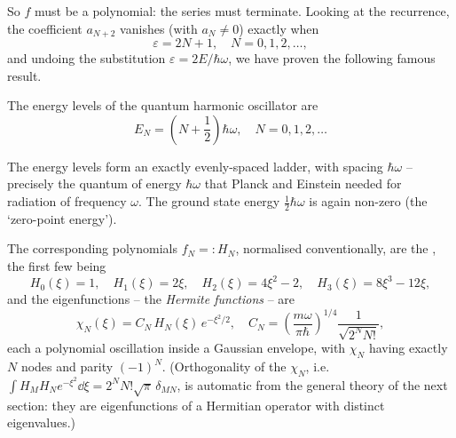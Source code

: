 \documentclass[a4paper]{scrartcl}
\begin{document}
So $f$ must be a polynomial: the series must terminate. Looking at the recurrence, the coefficient $a_{N+2}$ vanishes (with $a_N \neq 0$) exactly when
$$
\varepsilon = 2N + 1, \quad N = 0, 1, 2, \dots,
$$
and undoing the substitution $\varepsilon = 2E/\hbar\omega$, we have proven the following famous result.

\begin{theorem}
    The energy levels of the quantum harmonic oscillator are
    $$
    E_N = \left( N + \frac{1}{2} \right) \hbar \omega, \quad N = 0, 1, 2, \dots
    $$
\end{theorem}

The energy levels form an exactly evenly-spaced ladder, with spacing $\hbar \omega$ -- precisely the quantum of energy $\hbar\omega$ that Planck and Einstein needed for radiation of frequency $\omega$. The ground state energy $\frac{1}{2}\hbar \omega$ is again non-zero (the `zero-point energy').

The corresponding polynomials $f_N =: H_N$, normalised conventionally, are the , the first few being
$$
H_0(\xi) = 1, \quad H_1(\xi) = 2\xi, \quad H_2(\xi) = 4\xi^2 - 2, \quad H_3(\xi) = 8 \xi^3 - 12 \xi,
$$
and the eigenfunctions -- the \emph{Hermite functions} -- are
$$
\chi_N(\xi) = C_N \, H_N(\xi) \, e^{-\xi^2/2}, \quad C_N = \left(\frac{m\omega}{\pi \hbar}\right)^{1/4}\frac{1}{\sqrt{2^N N!}},
$$
each a polynomial oscillation inside a Gaussian envelope, with $\chi_N$ having exactly $N$ nodes and parity $(-1)^N$. (Orthogonality of the $\chi_N$, i.e.\ $\int H_M H_N e^{-\xi^2} \dd \xi = 2^N N! \sqrt{\pi} \, \delta_{MN}$, is automatic from the general theory of the next section: they are eigenfunctions of a Hermitian operator with distinct eigenvalues.)
\end{document}
